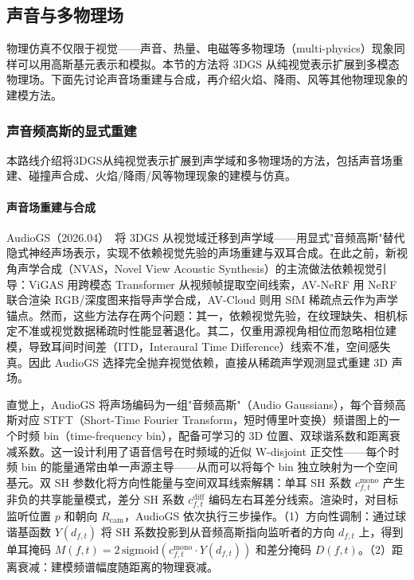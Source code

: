 \subsection{声音与多物理场}

物理仿真不仅限于视觉——声音、热量、电磁等多物理场（multi-physics）现象同样可以用高斯基元表示和模拟。本节的方法将 3DGS 从纯视觉表示扩展到多模态物理场。下面先讨论声音场重建与合成，再介绍火焰、降雨、风等其他物理现象的建模方法。

\subsubsection{声音频高斯的显式重建}

本路线介绍将3DGS从纯视觉表示扩展到声学域和多物理场的方法，包括声音场重建、碰撞声合成、火焰/降雨/风等物理现象的建模与仿真。

\paragraph{声音场重建与合成}

AudioGS（2026.04）~\cite{2604_08967}将 3DGS 从视觉域迁移到声学域——用显式"音频高斯"替代隐式神经声场表示，实现不依赖视觉先验的声场重建与双耳合成。在此之前，新视角声学合成（NVAS，Novel View Acoustic Synthesis）的主流做法依赖视觉引导：ViGAS 用跨模态 Transformer 从视频帧提取空间线索，AV-NeRF 用 NeRF 联合渲染 RGB/深度图来指导声学合成，AV-Cloud 则用 SfM 稀疏点云作为声学锚点。然而，这些方法存在两个问题：其一，依赖视觉先验，在纹理缺失、相机标定不准或视觉数据稀疏时性能显著退化。其二，仅重用源视角相位而忽略相位建模，导致耳间时间差（ITD，Interaural Time Difference）线索不准，空间感失真。因此 AudioGS 选择完全抛弃视觉依赖，直接从稀疏声学观测显式重建 3D 声场。

直觉上，AudioGS 将声场编码为一组"音频高斯"（Audio Gaussians），每个音频高斯对应 STFT（Short-Time Fourier Transform，短时傅里叶变换）频谱图上的一个时频 bin（time-frequency bin），配备可学习的 3D 位置、双球谐系数和距离衰减系数。这一设计利用了语音信号在时频域的近似 W-disjoint 正交性——每个时频 bin 的能量通常由单一声源主导——从而可以将每个 bin 独立映射为一个空间基元。双 SH 参数化将方向性能量与空间双耳线索解耦：单耳 SH 系数 $c^{\text{mono}}_{f,t}$ 产生非负的共享能量模式，差分 SH 系数 $c^{\text{diff}}_{f,t}$ 编码左右耳差分线索。渲染时，对目标监听位置 $p$ 和朝向 $R_{\text{cam}}$，AudioGS 依次执行三步操作。（1）方向性调制：通过球谐基函数 $Y(d_{f,t})$ 将 SH 系数投影到从音频高斯指向监听者的方向 $d_{f,t}$ 上，得到单耳掩码 $M(f,t) = 2\,\text{sigmoid}(c^{\text{mono}}_{f,t} \cdot Y(d_{f,t}))$ 和差分掩码 $D(f,t)$。（2）距离衰减：建模频谱幅度随距离的物理衰减。

